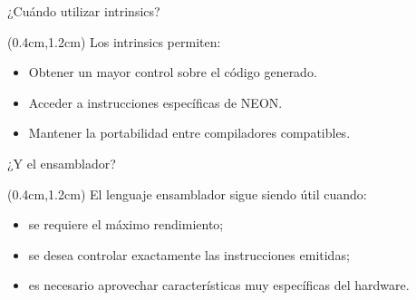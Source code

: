 \begin{frame}{¿Cuándo utilizar intrinsics?}
 \begin{textblock*}{\textwidth}(0.4cm,1.2cm)\justifying
  Los intrinsics permiten:
  \vspace{0.5cm}
  \begin{itemize}[<+(1)->] cm
   \item Obtener un mayor control sobre el código generado.
   \item Acceder a instrucciones específicas de NEON.
   \item Mantener la portabilidad entre compiladores compatibles.
  \end{itemize}
  \vspace{0.4cm}
 \end{textblock*}
\end{frame}


\begin{frame}{¿Y el ensamblador?}
 \begin{textblock*}{\textwidth}(0.4cm,1.2cm) \justifying
  El lenguaje ensamblador sigue siendo útil cuando:
  \vspace{0.4cm}
  \begin{itemize}[<+(1)->] cm
   \item se requiere el máximo rendimiento;
   \item se desea controlar exactamente las instrucciones emitidas;
   \item es necesario aprovechar características muy específicas del hardware.
  \end{itemize}
  \vspace{0.4cm}
 \end{textblock*}
\end{frame}
